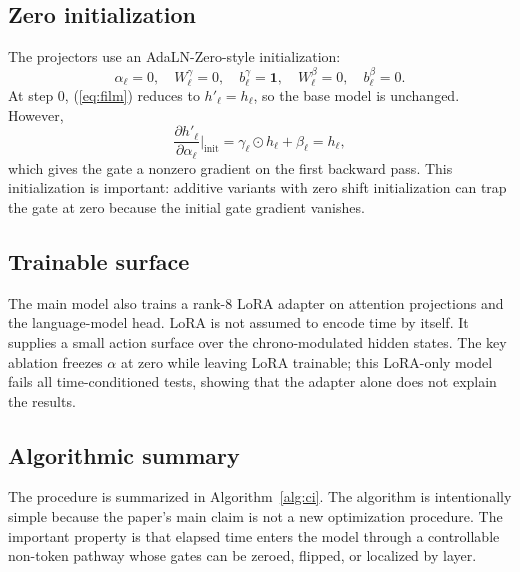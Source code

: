 \documentclass[conference,10pt]{IEEEtran}
\begin{document}
\subsection{Zero initialization}

The projectors use an AdaLN-Zero-style initialization:
\begin{equation}
\alpha_\ell=0,\quad W^\gamma_\ell=0,\quad b^\gamma_\ell=\mathbf{1},\quad W^\beta_\ell=0,\quad b^\beta_\ell=0.
\end{equation}
At step 0, (\ref{eq:film}) reduces to $h'_\ell=h_\ell$, so the base model is unchanged. However,
\begin{equation}
\frac{\partial h'_\ell}{\partial \alpha_\ell}\bigg|_{\text{init}}=\gamma_\ell\odot h_\ell+\beta_\ell=h_\ell,
\end{equation}
which gives the gate a nonzero gradient on the first backward pass. This initialization is important: additive variants with zero shift initialization can trap the gate at zero because the initial gate gradient vanishes.

\subsection{Trainable surface}

The main model also trains a rank-8 LoRA adapter on attention projections and the language-model head. LoRA is not assumed to encode time by itself. It supplies a small action surface over the chrono-modulated hidden states. The key ablation freezes $\alpha$ at zero while leaving LoRA trainable; this LoRA-only model fails all time-conditioned tests, showing that the adapter alone does not explain the results.

\subsection{Algorithmic summary}

The procedure is summarized in Algorithm~\ref{alg:ci}. The algorithm is intentionally simple because the paper's main claim is not a new optimization procedure. The important property is that elapsed time enters the model through a controllable non-token pathway whose gates can be zeroed, flipped, or localized by layer.
\end{document}
